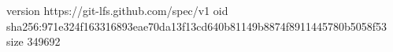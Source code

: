version https://git-lfs.github.com/spec/v1
oid sha256:971e324f163316893eae70da13f13cd640b81149b8874f8911445780b5058f53
size 349692
